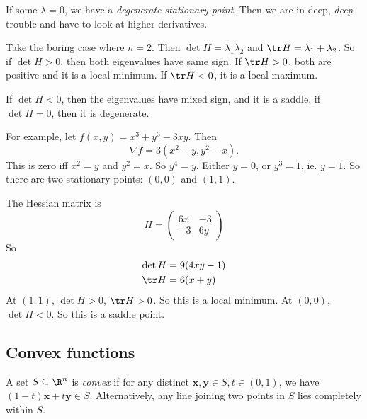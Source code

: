 \documentclass[a4paper]{article}
\begin{document}
If some $\lambda = 0$, we have a \emph{degenerate stationary point}. Then we are in deep, \emph{deep} trouble and have to look at higher derivatives.

\begin{eg}
  Take the boring case where $n = 2$. Then $\det H = \lambda_1 \lambda_2$ and $\tr H = \lambda_1 + \lambda_2$. So if $\det H > 0$, then both eigenvalues have same sign. If $\tr H > 0$, both are positive and it is a local minimum. If $\tr H < 0$, it is a local maximum.

  If $\det H < 0$, then the eigenvalues have mixed sign, and it is a saddle. if $\det H = 0$, then it is degenerate.

  For example, let $f(x, y) = x^3 + y^3 - 3xy$. Then
  \[
    \nabla f = 3(x^2 - y, y^2 - x).
  \]
  This is zero iff $x^2 = y$ and $y^2 = x$. So $y^4 = y$. Either $y = 0$, or $y^3 = 1$, ie. $y = 1$. So there are two stationary points: $(0, 0)$ and $(1, 1)$.

  The Hessian matrix is
  \[
    H =
    \begin{pmatrix}
      6x & -3\\
      -3 & 6y
    \end{pmatrix}
  \]
  So
  \begin{align*}
    \det H &= 9(4xy - 1)\\
    \tr H &= 6(x + y)
  \end{align*}
  At $(1, 1)$, $\det H > 0$, $\tr H > 0$. So this is a local minimum. At $(0, 0)$, $\det H < 0$. So this is a saddle point.
\end{eg}
\subsection{Convex functions}
\begin{defi}
  A set $S\subseteq \R^n$ is \emph{convex} if for any distinct $\mathbf{x}, \mathbf{y}\in S, t\in (0, 1)$, we have $(1 - t)\mathbf{x} + t\mathbf{y} \in S$. Alternatively, any line joining two points in $S$ lies completely within $S$.

  \begin{center}
  \end{center}
\end{defi}
\end{document}
